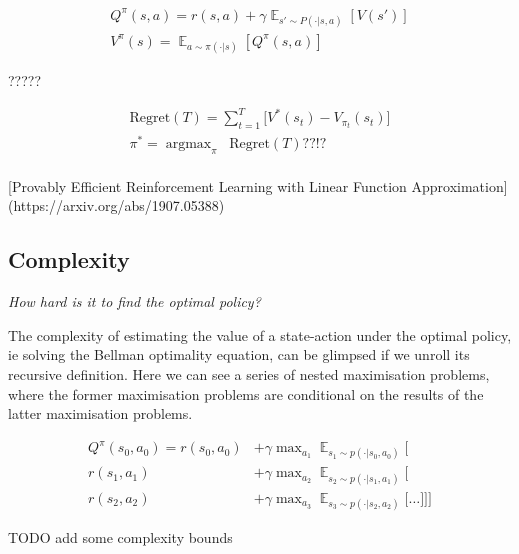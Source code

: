\begin{align*}
Q^{\pi}(s, a) = r(s, a) + \gamma \mathop{\mathbb E}_{s' \sim P(\cdot|s, a)} [V(s')] \label{eq:bellman-eqn}\tag{Bellman equation}\\
V^{\pi}(s) = \mathop{\mathbb E}_{a \sim \pi(\cdot|s)} [Q^{\pi}(s, a)]
\end{align*}


\vspace{5mm}

?????

\begin{align*}
\text{Regret}(T) = \sum^T_{t=1} \bigg[ V^{* }(s_t) - V_{\pi_t}(s_t) \bigg] \\
\pi^{* } = \mathop{\text{argmax}}_{\pi} \;\; \text{Regret}(T) ??!?\\
\end{align*}

[Provably Efficient Reinforcement Learning with Linear
Function Approximation](https://arxiv.org/abs/1907.05388)


\subsection{Complexity}

\begin{displayquote}
  \textit{How hard is it to find the optimal policy?}
\end{displayquote}

The complexity of estimating the value of a state-action under the optimal policy, ie solving the Bellman optimality
equation, can be glimpsed if we unroll its recursive definition.
Here we can see a series of nested maximisation problems, where the former
maximisation problems are conditional on the results of the latter maximisation problems.

\begin{align*}
Q^{\pi}(s_0, a_0) = r(s_0, a_0) &+ \gamma \mathop{\text{max}}_{a_1} \mathop{\mathbb E}_{s_1\sim p(\cdot | s_0, a_0)} \Bigg[ \\
r(s_1, a_1)  &+ \gamma \mathop{\text{max}}_{a_2} \mathop{\mathbb E}_{s_2\sim p(\cdot | s_1, a_1)} \bigg[\\
r(s_2, a_2)  &+ \gamma \mathop{\text{max}}_{a_3} \mathop{\mathbb E}_{s_3\sim p(\cdot | s_2, a_2)} \Big[
\dots \Big] \bigg] \Bigg]
\end{align*}

{\color{red}TODO add some complexity bounds}

